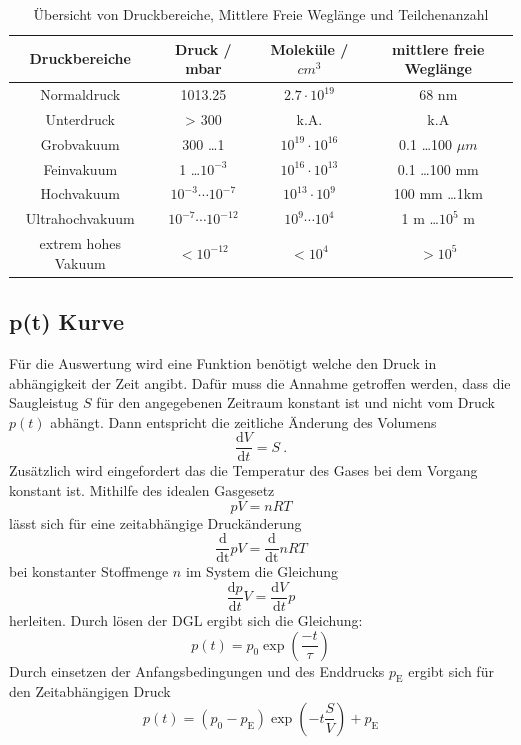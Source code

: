 \begin{table}
  \centering
  \caption{Übersicht von Druckbereiche, Mittlere Freie Weglänge und Teilchenanzahl}
  \begin{tabular}{c|c c c}
  	\toprule
	Druckbereiche & Druck / mbar & Moleküle / $cm^3$ & mittlere freie Weglänge \\
	\midrule
	Normaldruck	& 1013.25			& $2.7 \cdot 10^{19}$ &	68 nm \\
	Unterdruck	& > 300				& k.A. & k.A \\
	Grobvakuum	& 300 \ldots 1 			&$10^{19} \cdot 10^{16}$&0.1 \ldots 100 $\mu m$ \\
	Feinvakuum	& 1 \ldots $10^{-3}$		& $10^{16} \cdot 10^{13}$ & 0.1 \ldots 100 mm \\
	Hochvakuum	& $10^{-3} \cdots 10^{-7}$	& $10^{13} \cdot 10^{9}$ & 100 mm \ldots 1km \\
	Ultrahochvakuum	& $10^{-7} \cdots 10^{-12}$	& $10^9 \cdots 10^4$ & 1 m \ldots $10^5$ m \\
	extrem hohes Vakuum & $< 10^{-12}$		& $<10^4$ & $> 10^5$ \\
	\bottomrule
  \end{tabular}
  \label{tab:ueberblick}
\end{table}
\subsection{p(t) Kurve}
Für die Auswertung wird eine Funktion benötigt welche den Druck in abhängigkeit der Zeit angibt. Dafür muss die Annahme getroffen werden, dass die Saugleistug $S$ für den angegebenen Zeitraum konstant ist und nicht vom Druck $p(t)$ abhängt. Dann entspricht die zeitliche Änderung des Volumens 
\begin{equation}
  \frac{\text{d}V}{\text{d}t} = S \ .
\end{equation}
Zusätzlich wird eingefordert das die Temperatur des Gases bei dem Vorgang konstant ist. Mithilfe des idealen Gasgesetz
\begin{equation}
  p V = n R T
\end{equation}
lässt sich für eine zeitabhängige Druckänderung
\begin{equation}
  \frac{\text{d}}{\text{dt}} pV = \frac{\text{d}}{\text{dt}} n R T
\end{equation}
bei konstanter Stoffmenge $n$ im System die Gleichung 
\begin{equation}
  \frac{\text{d}p}{\text{d}t} V= \frac{\text{d}V}{\text{d}t} p
  \label{eqn:konti}
\end{equation}
herleiten. Durch lösen der DGL ergibt sich die Gleichung:
\begin{equation}
  p(t) = p_0 \exp \left( \frac{-t}{\tau} \right)
\end{equation}
Durch einsetzen der Anfangsbedingungen und des Enddrucks $p_\text{E}$ ergibt sich für den Zeitabhängigen Druck 
\begin{equation}
  p(t) = (p_0 - p_\text{E}) \exp \left( -t \frac{S}{V} \right) + p_\text{E}
\end{equation}
